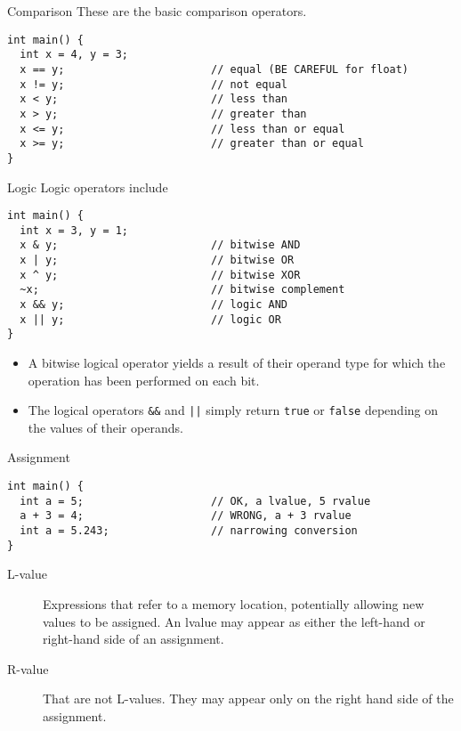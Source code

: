 \documentclass[presentation]{beamer}
\begin{document}
\begin{frame}[fragile,label={sec:orgheadline16}]{Comparison}
 These are the basic comparison operators.

\begin{verbatim}
int main() {
  int x = 4, y = 3;
  x == y;                       // equal (BE CAREFUL for float)
  x != y;                       // not equal
  x < y;                        // less than
  x > y;                        // greater than
  x <= y;                       // less than or equal
  x >= y;                       // greater than or equal
}
\end{verbatim}
\end{frame}

\begin{frame}[fragile,label={sec:orgheadline17}]{Logic}
 Logic operators include

\begin{verbatim}
int main() {
  int x = 3, y = 1;
  x & y;                        // bitwise AND
  x | y;                        // bitwise OR
  x ^ y;                        // bitwise XOR
  ~x;                           // bitwise complement
  x && y;                       // logic AND
  x || y;                       // logic OR
}
\end{verbatim}

\begin{itemize}
\item A bitwise logical operator yields a result of their operand type
for which the operation has been performed on each bit.
\item The logical operators \texttt{\&\&} and \texttt{||} simply return \texttt{true} or
\texttt{false} depending on the values of their operands.
\end{itemize}
\end{frame}

\begin{frame}[fragile,label={sec:orgheadline18}]{Assignment}
 \begin{verbatim}
int main() {
  int a = 5;                    // OK, a lvalue, 5 rvalue
  a + 3 = 4;                    // WRONG, a + 3 rvalue
  int a = 5.243;                // narrowing conversion
}
\end{verbatim}

\begin{description}
\item[{L-value}] Expressions that refer to a memory location,
potentially allowing new values to be assigned.  An lvalue may
appear as either the left-hand or right-hand side of an
assignment.
\item[{R-value}] That are not L-values.  They may appear only on the
right hand side of the assignment.
\end{description}
\end{frame}
\end{document}
